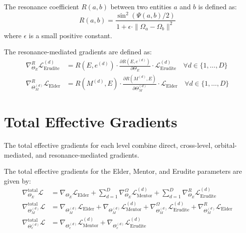 \begin{definition}
The resonance coefficient $R(a, b)$ between two entities $a$ and $b$ is defined as:
\begin{equation}
R(a, b) = \frac{\sin^2(\Psi(a, b)/2)}{1 + \epsilon \cdot \|\Omega_a - \Omega_b\|^2}
\end{equation}
where $\epsilon$ is a small positive constant.
\end{definition}

\begin{definition}
The resonance-mediated gradients are defined as:
\begin{align}
\nabla_{\Theta_E}^{R} \mathcal{L}_{\text{Erudite}}^{(d)} &= R(E, e^{(d)}) \cdot \frac{\partial R(E, e^{(d)})}{\partial \Theta_E} \cdot \mathcal{L}_{\text{Erudite}}^{(d)} \quad \forall d \in \{1, \ldots, D\} \\
\nabla_{\Theta_M^{(d)}}^{R} \mathcal{L}_{\text{Elder}} &= R(M^{(d)}, E) \cdot \frac{\partial R(M^{(d)}, E)}{\partial \Theta_M^{(d)}} \cdot \mathcal{L}_{\text{Elder}} \quad \forall d \in \{1, \ldots, D\}
\end{align}
\end{definition}

\section{Total Effective Gradients}

The total effective gradients for each level combine direct, cross-level, orbital-mediated, and resonance-mediated gradients.

\begin{theorem}
The total effective gradients for the Elder, Mentor, and Erudite parameters are given by:
\begin{align}
\nabla_{\Theta_E}^{\text{total}} \mathcal{L} &= \nabla_{\Theta_E} \mathcal{L}_{\text{Elder}} + \sum_{d=1}^D \nabla_{\Theta_E}^{\Omega} \mathcal{L}_{\text{Mentor}}^{(d)} + \sum_{d=1}^D \nabla_{\Theta_E}^{R} \mathcal{L}_{\text{Erudite}}^{(d)} \\
\nabla_{\Theta_M^{(d)}}^{\text{total}} \mathcal{L} &= \nabla_{\Theta_M^{(d)}} \mathcal{L}_{\text{Elder}} + \nabla_{\Theta_M^{(d)}} \mathcal{L}_{\text{Mentor}}^{(d)} + \nabla_{\Theta_M^{(d)}}^{\Omega} \mathcal{L}_{\text{Erudite}}^{(d)} + \nabla_{\Theta_M^{(d)}}^{R} \mathcal{L}_{\text{Elder}} \\
\nabla_{\Theta_e^{(d)}}^{\text{total}} \mathcal{L} &= \nabla_{\Theta_e^{(d)}} \mathcal{L}_{\text{Mentor}}^{(d)} + \nabla_{\Theta_e^{(d)}} \mathcal{L}_{\text{Erudite}}^{(d)}
\end{align}
\end{theorem}

